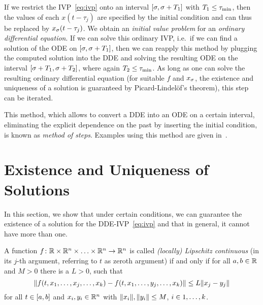     If we restrict the IVP~\eqref{eq:ivp} onto an interval $[\sigma,\sigma+T_1]$ with $T_1\leq\tau_{\min}$, then the values of each $x(t-\tau_j)$ are specified by the initial condition and can thus be replaced by $x_{\sigma}(t-\tau_j)$.
    We obtain an \emph{initial value problem} for an \emph{ordinary differential equation}.
    If we can solve this ordinary IVP, i.e.\ if we can find a solution of the ODE on $[\sigma,\sigma+T_1]$, then we can reapply this method by plugging the computed solution into the DDE and solving the resulting ODE on the interval $[\sigma+T_1,\sigma+T_2]$, where again $T_2\leq\tau_{\min}$. As long as one can solve the resulting ordinary differential equation (for suitable $f$ and $x_{\sigma}$, the existence and uniqueness of a solution is guaranteed by Picard-Lindelöf's theorem), this step can be iterated.

    This method, which allows to convert a DDE into an ODE on a certain interval, eliminating the explicit dependence on the past by inserting the initial condition, is known as \emph{method of steps}.
    Examples using this method are given in~\cite{Falbo06FDEs}.




\section{Existence and Uniqueness of Solutions}
    \label{solutions-existence-uniqueness}


    In this section, we show that under certain conditions, we can guarantee the existence of a solution for the DDE-IVP~\eqref{eq:ivp} and that in general, it cannot have more than one.


    \begin{definition}\label{def:lipschitz}
        A function $f\colon\mathbb{R}\times\mathbb{R}^n\times\ldots\times\mathbb{R}^n\to\mathbb{R}^n$ is called \emph{(locally) Lipschitz continuous} (in its $j$-th argument, referring to $t$ as zeroth argument) if and only if for all $a,b\in\mathbb{R}$ and $M>0$ there is a $L>0$, such that
        \begin{equation*}
            \nnorm*{f(t,x_1,\ldots,x_j,\ldots,x_k) - f(t,x_1,\ldots,y_j,\ldots,x_k)} \leq L\nnorm*{x_j-y_j}
        \end{equation*}
        for all $t\in[a,b]$ and $x_i,y_i\in\mathbb{R}^n$ with $\lVert x_i\rVert,\lVert y_i\rVert\leq M$, $i\in1,\ldots,k$.
    \end{definition}

